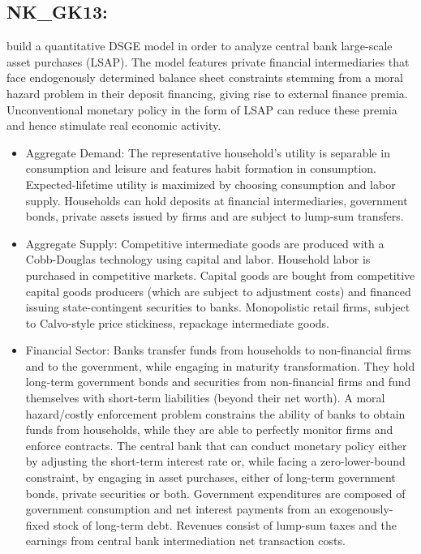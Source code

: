 \documentclass[11pt,a4paper]{article}
\begin{document}
	\subsection{NK\_GK13: \texorpdfstring{\cite{GertlerKaradi2013}}{Gertler and Karadi (2013)}}
	\label{NKGK13}
	\cite{GertlerKaradi2013} build a quantitative DSGE model in order to analyze central bank large-scale asset purchases (LSAP). The model features private financial intermediaries that face endogenously determined balance sheet constraints stemming from a moral hazard problem in their deposit financing, giving rise to external finance premia. Unconventional monetary policy in the form of LSAP can reduce these premia and hence stimulate real economic activity.
	\begin{itemize}
		\item	Aggregate Demand: The representative household's utility is separable in consumption and leisure and features habit formation in consumption. Expected-lifetime utility is maximized by choosing consumption and labor supply. Households can hold deposits at financial intermediaries, government bonds, private assets issued by firms and are subject to lump-sum transfers.
		\item Aggregate Supply: Competitive intermediate goods are produced with a Cobb-Douglas technology using capital and labor. Household labor is purchased in competitive markets. Capital goods are bought from competitive capital goods producers (which are subject to adjustment costs) and financed issuing state-contingent securities to banks. Monopolistic retail firms, subject to Calvo-style price stickiness, repackage intermediate goods.
		\item Financial Sector: Banks transfer funds from households to non-financial firms and to the government, while engaging in maturity transformation. They hold long-term government bonds and securities from non-financial firms and fund themselves with short-term liabilities (beyond their net worth). A moral hazard/costly enforcement problem constrains the ability of banks to obtain funds from households, while they are able to perfectly monitor firms and enforce contracts. The central bank that can conduct monetary policy either by adjusting the short-term interest rate or, while facing a zero-lower-bound constraint, by engaging in asset purchases, either of long-term government bonds, private securities or both. Government expenditures are composed of government consumption and net interest payments from an exogenously-fixed stock of long-term debt. Revenues consist of lump-sum taxes and the earnings from central bank intermediation net transaction costs.

\end{itemize}
\end{document}

